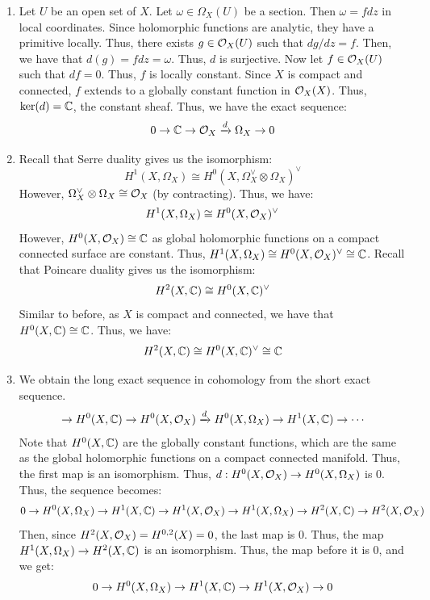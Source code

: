 \documentclass[12pt]{article}
\begin{document}
\begin{solution}
    \bbni 
    \begin{enumerate}
        \item Let $U$ be an open set of $X$. Let $\omega \in \Omega_X(U)$ be a section. Then $\omega = f dz$ in local coordinates. Since holomorphic functions are analytic, they have a primitive locally. Thus, there exists $g \in \mathcal{O}_X(U)$ such that $dg/dz = f$. Then, we have that $d(g) = f dz = \omega$. Thus, $d$ is surjective. \bbni
        Now let $f \in \mathcal{O}_X(U)$ such that $df = 0$. Thus, $f$ is locally constant. Since $X$ is compact and connected, $f$ extends to a globally constant function in $\mathcal{O}_X(X)$. Thus, $\ker(d) = \mathbb C$, the constant sheaf. \bbni
        Thus, we have the exact sequence:
        \[ 0 \to \mathbb C \to \mathcal{O}_X \xrightarrow{d} \Omega_X \to 0\]
        \item Recall that Serre duality gives us the isomorphism:
        \[ H^1(X, \Omega_X) \cong H^0(X, \Omega_X^\vee \otimes \Omega_X)^\vee\]
        However, $\Omega_X^\vee \otimes \Omega_X \cong \mathcal{O}_X$ (by contracting). Thus, we have:
        \[ H^1(X, \Omega_X) \cong H^0(X, \mathcal{O}_X)^\vee\]
        However, $H^0(X, \mathcal{O}_X) \cong \mathbb C$ as global holomorphic functions on a compact connected surface are constant. Thus, $H^1(X, \Omega_X) \cong H^0(X, \mathcal{O}_X)^\vee \cong \mathbb C$. \bbni
        Recall that Poincare duality gives us the isomorphism:
        \[ H^2(X, \mathbb C) \cong H^0(X, \mathbb C)^\vee\]
        Similar to before, as $X$ is compact and connected, we have that $H^0(X, \mathbb C) \cong \mathbb C$. Thus, we have:
        \[ H^2(X, \mathbb C) \cong H^0(X, \mathbb C)^\vee \cong \mathbb C\]
        \item We obtain the long exact sequence in cohomology from the short exact sequence. 
        \begin{align*}
            \to H^0(X, \mathbb C) \to H^0(X, \mathcal{O}_X) \xrightarrow{d} H^0(X, \Omega_X) \to H^1(X, \mathbb C) \to \cdots
        \end{align*}
        Note that $H^0(X, \mathbb C)$ are the globally constant functions, which are the same as the global holomorphic functions on a compact connected manifold. Thus, the first map is an isomorphism. Thus, $d:H^0(X, \mathcal{O}_X) \to H^0(X, \Omega_X)$ is $0$. Thus, the sequence becomes:
        \[0 \to H^0(X, \Omega_X) \to H^1(X, \mathbb C) \to H^1(X,\mathcal{O}_X) \to H^1(X, \Omega_X) \to H^2(X, \mathbb C) \to  H^2(X, \mathcal{O}_X) \]
        Then, since $H^2(X, \mathcal{O}_X) = H^{0,2}(X) = 0$, the last map is $0$. Thus, the map $H^1(X, \Omega_X) \to H^2(X, \mathbb C)$ is an isomorphism. Thus, the map before it is $0$, and we get:
        \[0 \to H^0(X, \Omega_X) \to H^1(X, \mathbb C) \to H^1(X,\mathcal{O}_X) \to 0  \]   

\end{enumerate}
\end{solution}
\end{document}
